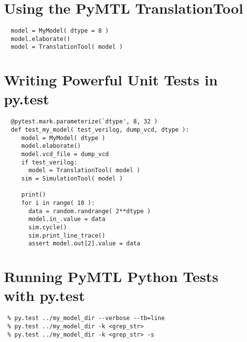 \documentclass{cbxdoc}
\begin{document}
\section{Using the PyMTL TranslationTool}
\begin{verbatim}
  model = MyModel( dtype = 8 ) 
  model.elaborate()
  model = TranslationTool( model )
\end{verbatim}

\section{Writing Powerful Unit Tests in py.test}
\begin{verbatim}
  @pytest.mark.parameterize(`dtype', 8, 32 )
  def test_my_model( test_verilog, dump_vcd, dtype ):
     model = MyModel( dtype )
     model.elaborate()
     model.vcd_file = dump_vcd
     if test_verilog:
       model = TranslationTool( model )
     sim = SimulationTool( model )

     print()
     for i in range( 10 ):
       data = random.randrange( 2**dtype )
       model.in_.value = data
       sim.cycle()
       sim.print_line_trace()
       assert model.out[2].value = data
\end{verbatim}


\section{Running PyMTL Python Tests with py.test}

\begin{verbatim}
 % py.test ../my_model_dir --verbose --tb=line
 % py.test ../my_model_dir -k <grep_str>
 % py.test ../my_model_dir -k <grep_str> -s
\end{verbatim}

\end{document}
